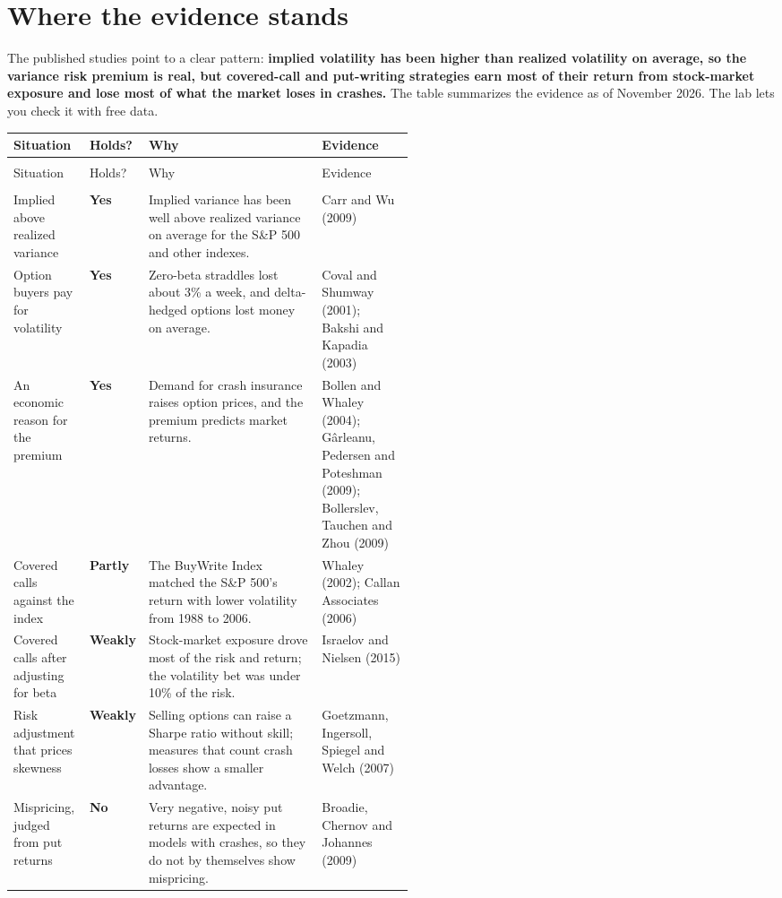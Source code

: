 \section{Where the evidence stands}
\label{sec:16-verdict}

The published studies point to a clear pattern: \textbf{implied volatility has been higher than realized volatility on average, so the variance risk premium is real, but covered-call and put-writing strategies earn most of their return from stock-market exposure and lose most of what the market loses in crashes.} The table summarizes the evidence as of November 2026. The lab lets you check it with free data.

{\small
\begin{longtable}{@{}>{\raggedright\arraybackslash}p{0.19\linewidth}>{\raggedright\arraybackslash}p{0.10\linewidth}>{\raggedright\arraybackslash}p{}>{\raggedright\arraybackslash}p{0.23\linewidth}@{}}
\toprule
Situation & Holds? & Why & Evidence \\
\midrule
\endfirsthead
\multicolumn{4}{@{}l}{\emph{(continued)}} \\
\toprule
Situation & Holds? & Why & Evidence \\
\midrule
\endhead
\midrule
\multicolumn{4}{r@{}}{\emph{(continued on the next page)}} \\
\endfoot
\bottomrule
\endlastfoot
Implied above realized variance & \textbf{Yes} & Implied variance has been well above realized variance on average for the S\&P 500 and other indexes. & Carr and Wu (2009) \\
\addlinespace[3pt]
Option buyers pay for volatility & \textbf{Yes} & Zero-beta straddles lost about 3\% a week, and delta-hedged options lost money on average. & Coval and Shumway (2001); Bakshi and Kapadia (2003) \\
\addlinespace[3pt]
An economic reason for the premium & \textbf{Yes} & Demand for crash insurance raises option prices, and the premium predicts market returns. & Bollen and Whaley (2004); G\^arleanu, Pedersen and Poteshman (2009); Bollerslev, Tauchen and Zhou (2009) \\
\addlinespace[3pt]
Covered calls against the index & \textbf{Partly} & The BuyWrite Index matched the S\&P 500's return with lower volatility from 1988 to 2006. & Whaley (2002); Callan Associates (2006) \\
\addlinespace[3pt]
Covered calls after adjusting for beta & \textbf{Weakly} & Stock-market exposure drove most of the risk and return; the volatility bet was under 10\% of the risk. & Israelov and Nielsen (2015) \\
\addlinespace[3pt]
Risk adjustment that prices skewness & \textbf{Weakly} & Selling options can raise a Sharpe ratio without skill; measures that count crash losses show a smaller advantage. & Goetzmann, Ingersoll, Spiegel and Welch (2007) \\
\addlinespace[3pt]
Mispricing, judged from put returns & \textbf{No} & Very negative, noisy put returns are expected in models with crashes, so they do not by themselves show mispricing. & Broadie, Chernov and Johannes (2009) \\
\end{longtable}
}

